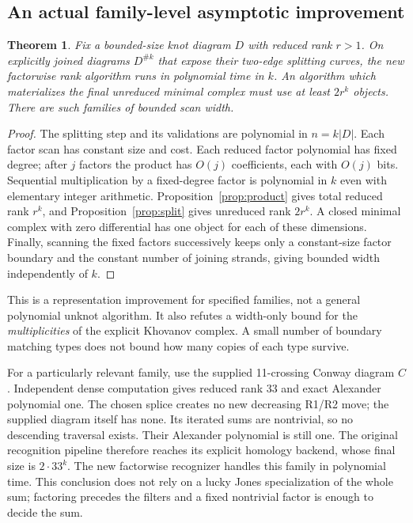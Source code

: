 \documentclass[11pt]{article}
\newtheorem{theorem}{Theorem}[section]
\theoremstyle{definition}\newtheorem{definition}[theorem]{Definition}
\theoremstyle{remark}\newtheorem{remark}[theorem]{Remark}
\begin{document}
\subsection{An actual family-level asymptotic improvement}
\begin{theorem}\label{thm:family}
Fix a bounded-size knot diagram $D$ with reduced rank $r>1$. On explicitly
joined diagrams $D^{\#k}$ that expose their two-edge splitting curves, the new
factorwise rank algorithm runs in polynomial time in $k$. An algorithm which
materializes the final unreduced minimal complex must use at least $2r^k$
objects. There are such families of bounded scan width.
\end{theorem}
\begin{proof}
The splitting step and its validations are polynomial in $n=k|D|$. Each factor
scan has constant size and cost. Each reduced factor polynomial has fixed
degree; after $j$ factors the product has $O(j)$ coefficients, each with
$O(j)$ bits. Sequential multiplication by a fixed-degree factor is polynomial
in $k$ even with elementary integer arithmetic. Proposition~\ref{prop:product}
gives total reduced rank $r^k$, and Proposition~\ref{prop:split} gives
unreduced rank $2r^k$. A closed minimal complex with zero differential has one
object for each of these dimensions. Finally, scanning the fixed factors
successively keeps only a constant-size factor boundary and the constant
number of joining strands, giving bounded width independently of $k$.
\end{proof}
This is a representation improvement for specified families, not a general
polynomial unknot algorithm. It also refutes a width-only bound for the
\emph{multiplicities} of the explicit Khovanov complex. A small number of
boundary matching types does not bound how many copies of each type survive.

For a particularly relevant family, use the supplied 11-crossing Conway
diagram $C$. Independent dense computation gives reduced rank 33 and exact
Alexander polynomial one. The chosen splice creates no new decreasing R1/R2
move; the supplied diagram itself has none. Its iterated sums are nontrivial,
so no descending traversal exists. Their Alexander polynomial is still one.
The original recognition pipeline therefore reaches its explicit homology
backend, whose final size is $2\cdot33^k$. The new factorwise recognizer handles
this family in polynomial time. This conclusion does not rely on a lucky
Jones specialization of the whole sum; factoring precedes the filters and a
fixed nontrivial factor is enough to decide the sum.
\end{document}

